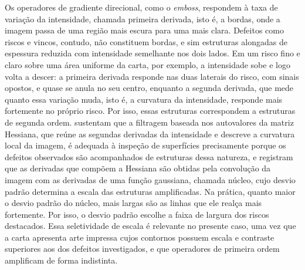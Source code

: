 \documentclass[
    12pt,                %
    openright,           %
    oneside,             %
    a4paper,             %
    english,             %
    brazil               %
]{abntex2}
\begin{document}
Os operadores de gradiente direcional, como o \textit{emboss},
respondem à taxa de variação da intensidade, chamada primeira derivada,
isto é, a bordas, onde a imagem passa de uma região mais escura para
uma mais clara. Defeitos como riscos
e vincos, contudo, não constituem bordas, e sim estruturas alongadas de
espessura reduzida com intensidade semelhante nos dois lados. Em um
risco fino e claro sobre uma área uniforme da carta, por exemplo, a
intensidade sobe e logo volta a descer: a primeira derivada responde
nas duas laterais do risco, com sinais opostos, e quase se anula no seu
centro, enquanto a segunda derivada, que mede quanto essa variação
muda, isto é, a curvatura da intensidade, responde mais fortemente no
próprio risco. Por isso, essas estruturas
correspondem a estruturas de segunda ordem. 
sustentam que a filtragem baseada nos autovalores da matriz Hessiana, que
reúne as segundas derivadas da intensidade e descreve a curvatura local
da imagem, é adequada à inspeção de superfícies precisamente porque os defeitos
observados são acompanhados de estruturas dessa natureza, e registram
que as derivadas que compõem a Hessiana são obtidas pela convolução da
imagem com as derivadas de uma função gaussiana, chamada núcleo, cujo
desvio padrão determina a escala das estruturas amplificadas. Na
prática, quanto maior o desvio padrão do núcleo, mais largas são as
linhas que ele realça mais fortemente. Por isso, o desvio padrão escolhe
a faixa de largura dos riscos destacados. Essa seletividade de escala é relevante no
presente caso, uma vez que a carta apresenta arte impressa cujos
contornos possuem escala e contraste superiores aos dos defeitos
investigados, e que operadores de primeira ordem amplificam de forma
indistinta.
\end{document}
